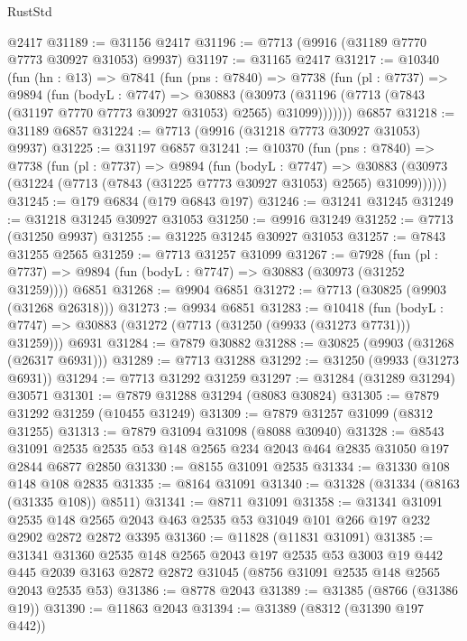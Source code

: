 \begin{lexlean}{RustStd}
\begin{coremodule}
    @2417
@31189 := @31156 @2417
@31196 := @7713 (@9916 (@31189 @7770 @7773 @30927 @31053) @9937)
@31197 := @31165 @2417
@31217 := @10340
    (fun (hn : @13) =>
    @7841
      (fun (pns : @7840) =>
      @7738
        (fun (pl : @7737) =>
        @9894
          (fun (bodyL : @7747) =>
          @30883
            (@30973 (@31196 (@7713 (@7843 (@31197 @7770 @7773 @30927 @31053) @2565) @31099)))))))
    @6857
@31218 := @31189 @6857
@31224 := @7713 (@9916 (@31218 @7773 @30927 @31053) @9937)
@31225 := @31197 @6857
@31241 := @10370
    (fun (pns : @7840) =>
    @7738
      (fun (pl : @7737) =>
      @9894
        (fun (bodyL : @7747) =>
        @30883 (@30973 (@31224 (@7713 (@7843 (@31225 @7773 @30927 @31053) @2565) @31099))))))
@31245 := @179 @6834 (@179 @6843 @197)
@31246 := @31241 @31245
@31249 := @31218 @31245 @30927 @31053
@31250 := @9916 @31249
@31252 := @7713 (@31250 @9937)
@31255 := @31225 @31245 @30927 @31053
@31257 := @7843 @31255 @2565
@31259 := @7713 @31257 @31099
@31267 := @7928
    (fun (pl : @7737) => @9894 (fun (bodyL : @7747) => @30883 (@30973 (@31252 @31259))))
    @6851
@31268 := @9904 @6851
@31272 := @7713 (@30825 (@9903 (@31268 @26318)))
@31273 := @9934 @6851
@31283 := @10418
    (fun (bodyL : @7747) => @30883 (@31272 (@7713 (@31250 (@9933 (@31273 @7731))) @31259)))
    @6931
@31284 := @7879 @30882
@31288 := @30825 (@9903 (@31268 (@26317 @6931)))
@31289 := @7713 @31288
@31292 := @31250 (@9933 (@31273 @6931))
@31294 := @7713 @31292 @31259
@31297 := @31284 (@31289 @31294) @30571
@31301 := @7879 @31288 @31294 (@8083 @30824)
@31305 := @7879 @31292 @31259 (@10455 @31249)
@31309 := @7879 @31257 @31099 (@8312 @31255)
@31313 := @7879 @31094 @31098 (@8088 @30940)
@31328 := @8543
    @31091
    @2535
    @2535
    @53
    @148
    @2565
    @234
    @2043
    @464
    @2835
    @31050
    @197
    @2844
    @6877
    @2850
@31330 := @8155 @31091 @2535
@31334 := @31330 @108 @148 @108 @2835
@31335 := @8164 @31091
@31340 := @31328 (@31334 (@8163 (@31335 @108)) @8511)
@31341 := @8711 @31091
@31358 := @31341
    @31091
    @2535
    @148
    @2565
    @2043
    @463
    @2535
    @53
    @31049
    @101
    @266
    @197
    @232
    @2902
    @2872
    @2872
    @3395
@31360 := @11828 (@11831 @31091)
@31385 := @31341
    @31360
    @2535
    @148
    @2565
    @2043
    @197
    @2535
    @53
    @3003
    @19
    @442
    @445
    @2039
    @3163
    @2872
    @2872
    @31045
    (@8756 @31091 @2535 @148 @2565 @2043 @2535 @53)
@31386 := @8778 @2043
@31389 := @31385 (@8766 (@31386 @19))
@31390 := @11863 @2043
@31394 := @31389 (@8312 (@31390 @197 @442))

\end{coremodule}
\end{lexlean}
